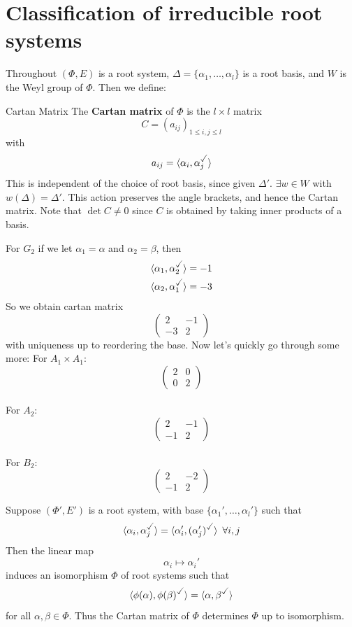 \documentclass{article}
\begin{document}
\section{Classification of irreducible root systems}
Throughout $(\Phi, E)$ is a root system, $\Delta = \{ \alpha_{1}, \dots, \alpha_{l}\}$ is a root basis, and $W$ is the Weyl group of $\Phi$. Then we define:
\begin{fancydefine*}{Cartan Matrix}
    The \textbf{Cartan matrix} of $\Phi$ is the $l \times l$ matrix \[ C = (a_{ij})_{1\leq i,j \leq l}\] with \[a_{ij} = \langle \alpha_{i}, \alpha_{j}^{\checked}\rangle\]
    This is independent of the choice of root basis, since given $\Delta'$. $\exists w \in W$ with $w(\Delta)=\Delta'$. This action preserves the angle brackets, and hence the Cartan matrix. Note that $\det C \neq 0$ since $C$ is obtained by taking inner products of a basis.
\end{fancydefine*}
\begin{ex*}
    For $G_{2}$ if we let $\alpha_{1}=\alpha$ and $\alpha_{2}=\beta$, then \begin{align*}
        \langle \alpha_{1}, \alpha_{2}^{\checked} \rangle = -1\\
        \langle \alpha_{2}, \alpha_{1}^{\checked} \rangle = -3
    \end{align*}
    So we obtain cartan matrix \[ \begin{pmatrix}
        2 & -1\\
        -3 & 2
    \end{pmatrix} \]
    with uniqueness up to reordering the base. Now let's quickly go through some more:\gap 
    For $A_{1} \times A_{1}$: \[ \begin{pmatrix}
        2 & 0\\
        0 & 2
    \end{pmatrix}\]
    \hspace{0.1cm}\\
    For $A_{2}$: \[ \begin{pmatrix}
        2 & -1\\
        -1 & 2
    \end{pmatrix}\]
    \hspace{0.1cm}\\
    For $B_{2}$:
    \[ \begin{pmatrix}
        2 & -2\\
        -1 & 2
    \end{pmatrix}\]
\end{ex*}
\begin{fancyprop}{}
    Suppose $(\Phi', E')$ is a root system, with base $\{ \alpha_{1}', \dots, \alpha_{l}'\}$ such that
    \[ \langle \alpha_{i}, \alpha_{j}^{\checked} \rangle = \langle \alpha_{i}', (\alpha_{j}')^{\checked} \rangle \, \,\, \forall i,j\] Then the linear map \[ \alpha_{i} \mapsto \alpha_{i}' \] induces an isomorphism $\Phi$ of root systems such that \[ \langle \phi(\alpha), \phi(\beta)^{\checked} \rangle = \langle \alpha, \beta^{\checked} \rangle \] for all $\alpha, \beta \in \Phi$. Thus the Cartan matrix of $\Phi$ determines $\Phi$ up to isomorphism.
\end{fancyprop}
\end{document}
